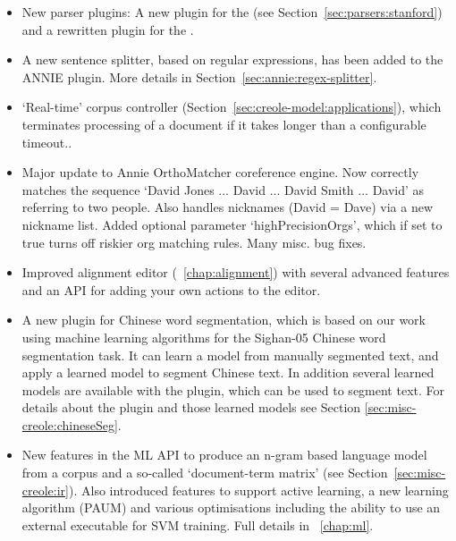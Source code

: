
\begin{itemize}
\item New parser plugins: A new plugin for the 
  (see Section~\ref{sec:parsers:stanford}) and a rewritten plugin for the 
  .

\item A new sentence splitter, based on regular expressions, has been added to
  the ANNIE plugin. More details in Section~\ref{sec:annie:regex-splitter}.

\item `Real-time' corpus controller (Section~\ref{sec:creole-model:applications}), which
  terminates processing of a document if it takes longer than a configurable
  timeout..
  
\item Major update to Annie OrthoMatcher coreference engine.  Now correctly matches 
   the sequence `David Jones ... David ... David Smith ... David' as referring to 
   two people.  Also handles nicknames (David = Dave) via a new nickname list.  Added
   optional parameter `highPrecisionOrgs', which if set to true turns off riskier org 
   matching rules.  Many misc. bug fixes.

\item Improved alignment editor (\Chapthing~\ref{chap:alignment}) with several
  advanced features and an API for adding your own actions to the editor.

\item A new plugin for Chinese word segmentation, which is
  based on our work using machine learning algorithms for the Sighan-05 Chinese
  word segmentation task. It can learn a model from manually segmented text, and
  apply a learned model to segment Chinese text. In addition several learned
  models are available with the plugin, which can be used to segment text. For
  details about the plugin and those learned models see Section
  \ref{sec:misc-creole:chineseSeg}.

\item New features in the ML API to produce an n-gram based language model from
  a corpus and a so-called `document-term matrix' (see
  Section~\ref{sec:misc-creole:ir}).  Also introduced features to support active learning,
  a new learning algorithm (PAUM) and various optimisations including the
  ability to use an external executable for SVM training.  Full details in
  \Chapthing~\ref{chap:ml}.


\end{itemize}
